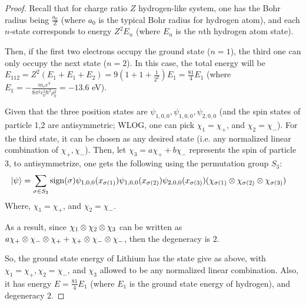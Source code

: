 \documentclass{article}
\begin{document}
\begin{proof}
    Recall that for charge ratio $Z$ hydrogen-like system, one has the Bohr radius being $\frac{a_0}{Z}$ (where $a_0$ is the typical Bohr radius for hydrogen atom), and each $n$-state corresponds to energy $Z^2E_n$ (where $E_n$ is the $n$th hydrogen atom state).

    Then, if the first two electrons occupy the ground state ($n=1$), the third one can only occupy the next state ($n=2$). In this case, the total energy will be $E_{112} = Z^2(E_1+E_1+E_2) = 9(1+1+\frac{1}{2^2})E_1 = \frac{81}{4}E_1$ (where $E_1 = -\frac{m_e e^4}{8\pi^2\epsilon_0^2\hbar^2\rho_0^2} = -13.6 $ eV).

    \hfil

    Given that the three position states are $\psi_{1,0,0},\psi_{1,0,0},\psi_{2,0,0}$ (and the spin states of particle 1,2 are antisymmetric; WLOG, one can pick $\chi_1=\chi_+$, and $\chi_2 = \chi_-$). For the third state, it can be chosen as any desired state (i.e. any normalized linear combination of $\chi_+,\chi_-$). Then, let $\chi_3 = a\chi_++b\chi_-$ represents the spin of particle 3, to antisymmetrize, one gets the following using the permutation group $S_3$:
    \begin{align}
        \ket{\psi} &= \sum_{\sigma\in S_3}\mathrm{sign}(\sigma)\psi_{1,0,0}(x_{\sigma(1)})\psi_{1,0,0}(x_{\sigma(2)})\psi_{2,0,0}(x_{\sigma(3)})(\chi_{\sigma(1)}\otimes \chi_{\sigma(2)}\otimes \chi_{\sigma(3)})
    \end{align} 
    Where, $\chi_1 = \chi_+$, and $\chi_2 = \chi_-$.

    As a result, since $\chi_1\otimes\chi_2\otimes\chi_3$ can be written as $a\chi_+\otimes \chi_-\otimes \chi_++\chi_+\otimes\chi_-\otimes\chi_-$, then the degeneracy is $2$.

    So, the ground state energy of Lithium has the state give as above, with $\chi_1 = \chi_+,\chi_2 = \chi_-$, and $\chi_3$ allowed to be any normalized linear combination. Also, it has energy $E = \frac{81}{4}E_1$ (where $E_1$ is the ground state energy of hydrogen), and degeneracy $2$.
\end{proof}
\end{document}
